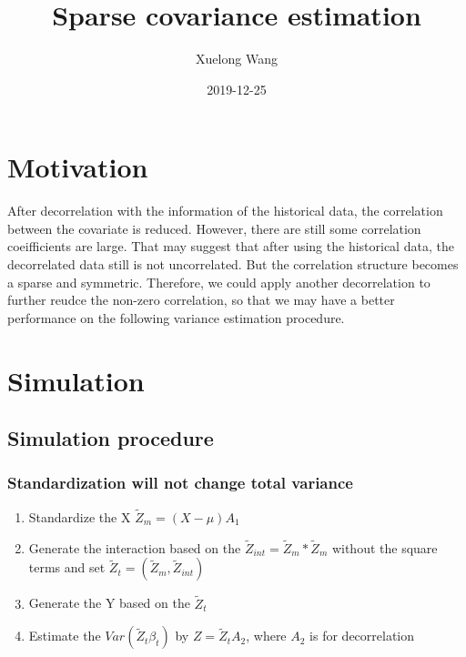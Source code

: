 \documentclass[]{article}
\title{Sparse covariance estimation}
\author{Xuelong Wang}
\date{2019-12-25}
\providecommand{\tightlist}{%
  \setlength{\itemsep}{0pt}\setlength{\parskip}{0pt}}
\begin{document}
\maketitle

{
\setcounter{tocdepth}{2}
\tableofcontents
}
\section{Motivation}\label{motivation}

After decorrelation with the information of the historical data, the
correlation between the covariate is reduced. However, there are still
some correlation coeifficients are large. That may suggest that after
using the historical data, the decorrelated data still is not
uncorrelated. But the correlation structure becomes a sparse and
symmetric. Therefore, we could apply another decorrelation to further
reudce the non-zero correlation, so that we may have a better
performance on the following variance estimation procedure.

\section{Simulation}\label{simulation}

\subsection{Simulation procedure}\label{simulation-procedure}

\subsubsection{Standardization will not change total
variance}\label{standardization-will-not-change-total-variance}

\begin{enumerate}
\def\labelenumi{\arabic{enumi}.}
\tightlist
\item
  Standardize the X \(\tilde{Z}_m = (X-\mu)A_1\)
\item
  Generate the interaction based on the
  \(\tilde{Z}_{int} = \tilde{Z}_m*\tilde{Z}_m\) without the square terms
  and set \(\tilde{Z}_t = (\tilde{Z}_m, \tilde{Z}_{int})\)
\item
  Generate the Y based on the \(\tilde{Z}_t\)
\item
  Estimate the \(Var(\tilde{Z}_t \beta_t)\) by \(Z = \tilde{Z}_tA_2\),
  where \(A_2\) is for decorrelation
\end{enumerate}
\end{document}
